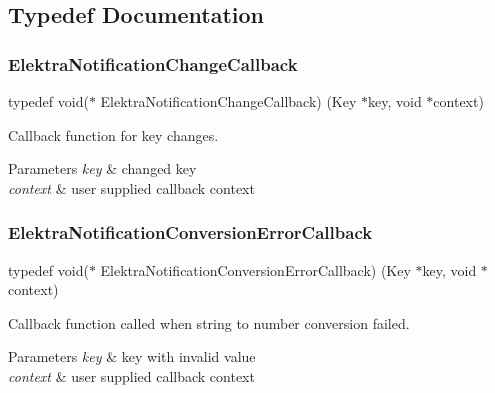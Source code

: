 \subsection{Typedef Documentation}
\mbox{\label{group__kdbnotification_gad0d800e32a72d89780321e5723301eb9}} 
\subsubsection{\texorpdfstring{Elektra\+Notification\+Change\+Callback}{ElektraNotificationChangeCallback}}
{\footnotesize\ttfamily typedef void($\ast$ Elektra\+Notification\+Change\+Callback) (Key $\ast$key, void $\ast$context)}



Callback function for key changes. 


\begin{DoxyParams}{Parameters}
{\em key} & changed key \\
\hline
{\em context} & user supplied callback context \\
\hline
\end{DoxyParams}
\mbox{\label{group__kdbnotification_gaad19fb981cad906eb9c72bd602c7bb64}} 
\subsubsection{\texorpdfstring{Elektra\+Notification\+Conversion\+Error\+Callback}{ElektraNotificationConversionErrorCallback}}
{\footnotesize\ttfamily typedef void($\ast$ Elektra\+Notification\+Conversion\+Error\+Callback) (Key $\ast$key, void $\ast$context)}



Callback function called when string to number conversion failed. 


\begin{DoxyParams}{Parameters}
{\em key} & key with invalid value \\
\hline
{\em context} & user supplied callback context \\
\hline
\end{DoxyParams}


